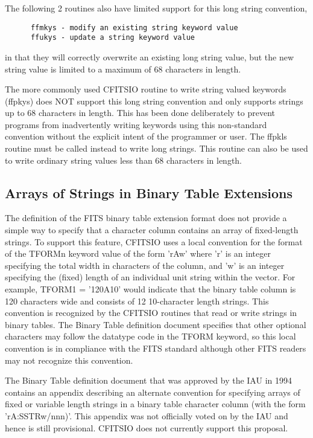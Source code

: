The following 2 routines also have limited support for this
long string convention,

\begin{verbatim}
      ffmkys - modify an existing string keyword value
      ffukys - update a string keyword value
\end{verbatim}
in that they will correctly overwrite an existing long string value,
but the new string value is limited to a maximum of 68 characters in
length.

The more commonly used CFITSIO routine to write string valued
keywords (ffpkys) does NOT support this long string convention and only
supports strings up to 68 characters in length.  This has been done
deliberately to prevent programs from inadvertently writing keywords
using this non-standard convention without the explicit intent of the
programmer or user.   The ffpkls routine must be called instead to
write long strings.  This routine can also be used to write ordinary
string values less than 68 characters in length.


\subsection{Arrays of Strings in Binary Table Extensions}

The definition of the FITS binary table extension format does not
provide a simple way to specify that a character column contains an
array of fixed-length strings.  To support this feature, CFITSIO uses a
local convention for the format of the TFORMn keyword value of the form
'rAw' where 'r' is an integer specifying the total width in characters
of the column, and 'w' is an integer specifying the (fixed) length of
an individual unit string within the vector.  For example, TFORM1 =
'120A10' would indicate that the binary table column is 120 characters
wide and consists of 12 10-character length strings.  This convention
is recognized by the CFITSIO routines that read or write strings in
binary tables.   The Binary Table definition document specifies that
other optional characters may follow the datatype code in the TFORM
keyword, so this local convention is in compliance with the
FITS standard although other FITS readers may not
recognize this convention.

The Binary Table definition document that was approved by the IAU in
1994 contains an appendix describing an alternate convention for
specifying arrays of fixed or variable length strings in a binary table
character column (with the form 'rA:SSTRw/nnn)'.  This appendix was not
officially voted on by the IAU and hence is still provisional.  CFITSIO
does not currently support this proposal.


